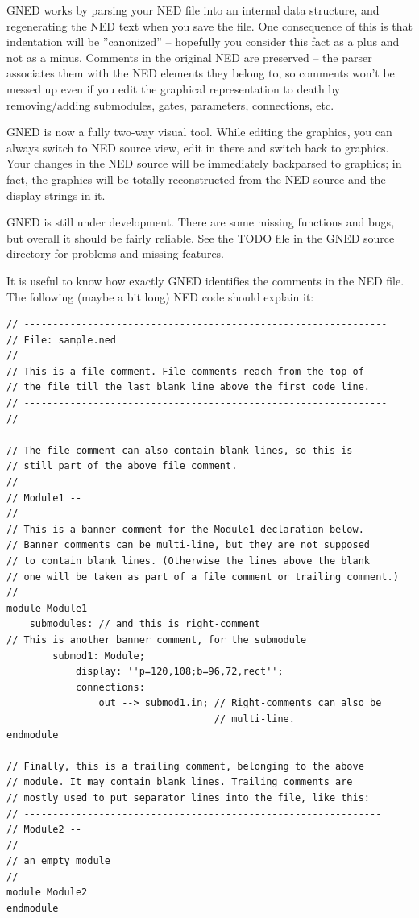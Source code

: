 GNED works by parsing your NED file into an internal data structure, 
and regenerating the NED text when you save the file. One consequence 
of this is that indentation will be ''canonized'' 
-- hopefully you consider this fact as a plus and not as a minus. 
Comments in the original NED are preserved -- the parser associates 
them with the NED elements they belong to, so comments won't 
be messed up even if you edit the graphical representation to 
death by removing/adding submodules, gates, parameters, connections, 
etc.

GNED is now a fully two-way visual tool. While editing the graphics, 
you can always switch to NED source view, edit in there and switch 
back to graphics. Your changes in the NED source will be immediately 
backparsed to graphics; in fact, the graphics will be totally 
reconstructed from the NED source and the display strings in 
it.

GNED is still under development. There are some missing functions 
and bugs, but overall it should be fairly reliable. See the TODO 
file in the GNED source directory for problems and missing features.




It is useful to know how exactly GNED identifies the comments 
in the NED file. The following (maybe a bit long) NED code should 
explain it:

\begin{Verbatim}
// ---------------------------------------------------------------
// File: sample.ned
//
// This is a file comment. File comments reach from the top of 
// the file till the last blank line above the first code line.
// ---------------------------------------------------------------
//

// The file comment can also contain blank lines, so this is 
// still part of the above file comment.
//
// Module1 --
//
// This is a banner comment for the Module1 declaration below.
// Banner comments can be multi-line, but they are not supposed 
// to contain blank lines. (Otherwise the lines above the blank 
// one will be taken as part of a file comment or trailing comment.)
//
module Module1
    submodules: // and this is right-comment
// This is another banner comment, for the submodule
        submod1: Module;
            display: ''p=120,108;b=96,72,rect'';
            connections:
                out --> submod1.in; // Right-comments can also be
                                    // multi-line.
endmodule

// Finally, this is a trailing comment, belonging to the above
// module. It may contain blank lines. Trailing comments are 
// mostly used to put separator lines into the file, like this:
// --------------------------------------------------------------
// Module2 --
//
// an empty module
//
module Module2
endmodule
\end{Verbatim}


